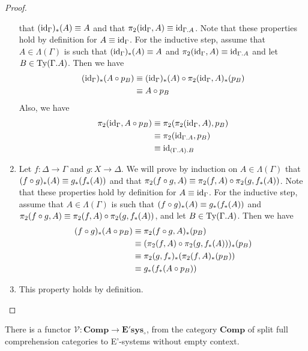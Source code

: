 \begin{proof}
\begin{enumerate}[label=(\alph*)]
that $({\mathrm{id}_{\Gamma}})_\ast(A)\equiv A$ and that $\pi_2(\catid{\Gamma},A)\jdeq \catid{\ctxext{\Gamma}{A}}$.
Note that these properties hold by definition for $A\equiv{\mathrm{id}_{\Gamma}}$. For the
inductive step, assume that $A\in\Lambda(\Gamma)$ is such that
$({\mathrm{id}_{\Gamma}})_\ast(A)\equiv A$ and $\pi_2(\catid{\Gamma},A)\jdeq
\catid{\ctxext{\Gamma}{A}}$ and let $B\in\mathrm{Ty}(\ctxext{\Gamma}{A})$. Then
we have
\begin{align*}
({\mathrm{id}_{\Gamma}})_\ast(A\circ p_B) & \equiv ({\mathrm{id}_{\Gamma}})_\ast(A)\circ \pi_2({\mathrm{id}_{\Gamma}},A)_\ast(p_B) \\
& \equiv A\circ p_B
\end{align*}
Also, we have
\begin{align*}
\pi_2(\catid{\Gamma},A\circ p_B) & \jdeq \pi_2(\pi_2(\catid{\Gamma},A),p_B) \\
& \jdeq \pi_2(\catid{\ctxext{\Gamma}{A}},p_B) \\
& \jdeq \catid{\ctxext{{\Gamma}{A}}{B}}
\end{align*}
\item Let $f:\Delta\to \Gamma$ and $g:X\to \Delta$. We will prove by induction
on $A\in\Lambda(\Gamma)$ that $(f\circ g)_\ast(A)\equiv g_\ast(f_\ast(A))$ and
that $\pi_2(f\circ g,A)\equiv \pi_2(f,A)\circ \pi_2(g,f_\ast(A))$. Note that
these properties hold by definition for $A\equiv{\mathrm{id}_{\Gamma}}$. For the inductive
step, assume that $A\in\Lambda(\Gamma)$ is such that $(f\circ g)_\ast(A)\equiv g_\ast(f_\ast(A))$ and
$\pi_2(f\circ g,A)\equiv \pi_2(f,A)\circ \pi_2(g,f_\ast(A))$, and let
$B\in\mathrm{Ty}(\ctxext{\Gamma}{A})$. Then we have
\begin{align*}
(f\circ g)_\ast(A\circ p_B) & \equiv \pi_2(f\circ g,A)_\ast(p_B) \\
& \equiv (\pi_2(f,A)\circ\pi_2(g,f_\ast(A)))_\ast(p_B) \\
& \equiv \pi_2(g,f_\ast)_\ast(\pi_2(f,A)_\ast(p_B)) \\
& \equiv g_\ast(f_\ast(A\circ p_B))
\end{align*}
\item This property holds by definition.\qedhere
\end{enumerate}
\end{proof}

\begin{defn}
There is a functor $\mathcal{V}:\mathbf{Comp}\to\mathbf{E'sys_{\circ}}$, from
the category $\mathbf{Comp}$ of split full comprehension categories to
E'-systems without empty context.
\end{defn}

